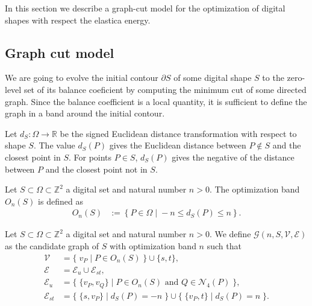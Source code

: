\documentclass[review]{siamart220329}
\begin{document}
In this section we describe a graph-cut model for the optimization of digital shapes with respect the elastica energy.

 
\subsection{Graph cut model}\label{sec:graph-cut-model}

We are going to evolve the initial contour $\partial S$ of some digital shape $S$ to the zero-level set of its balance coeficient by computing the minimum cut of some directed graph. Since the balance coefficient is a local quantity, it is sufficient to define the graph in a band around the initial contour.

Let $d_{S}:\Omega \rightarrow \mathbb{R}$ be the signed Euclidean distance transformation with respect to shape $S$. The value $d_{S}(P)$ gives the Euclidean distance between $P \notin S$ and the closest point in $S$. For points $P \in S$, $d_{S}(P)$ gives the negative of the distance between $P$ and the closest point not in $S$.

\begin{definition}
Let $S \subset \Omega \subset \mathbb{Z}^2$ a digital set and natural number $n>0$. The optimization band $O_n(S)$ is defined as
%
%
\begin{align*}
	O_n(S) &:=\left\{ P \in \Omega \; | \; -n \leq d_{S}(P) \leq n \right\}.
\end{align*}
\end{definition}
%
%
\begin{definition}
Let $S \subset \Omega \subset \mathbb{Z}^2$ a digital set and natural number $n>0$. We define $\mathcal{G}(n,S,\mathcal{V},\mathcal{E})$ as the candidate graph of $S$ with optimization band $n$ such that
%
%
\begin{align*}
\mathcal{V} &= \big\{\; v_P \; | \; P \in O_n(S) \;\} \cup \{s,t \big\}, \\
\mathcal{E} &= \mathcal{E}_u \cup \mathcal{E}_{st}, \\
\mathcal{E}_u &= \big\{ \; \{v_P,v_Q\} \; | \; P \in O_n(S) \text{ and } Q \in \mathcal{N}_4(P) \; \big\}, \\
\mathcal{E}_{st} &= \big\{\; \{s,v_P\} \; | \; d_S(P)=-n \; \big\} \cup \big\{\; \{v_P,t\} \; | \; d_S(P)=n \; \big\}.
\end{align*}
%
%
\end{definition}
\end{document}
